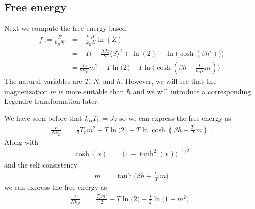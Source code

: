 \subsection{Free energy}
Next we compute the free energy based 
%
\begin{align*}
f:=\frac{F}{k_{B} N} &=-\frac{k_{B}T}{k_{B} N} \ln(Z)\\
&=-T \bigg( -\frac{\beta J z}{2} \langle S \rangle^{2} 
+\ln(2) 
+\ln\big( \cosh(\beta h')   \big) 
\bigg)\\
&=
\frac{J z}{2 k_{B}} m^{2}  - T
\ln\big(2\big)  - T\ln\big( \cosh(\beta h + \frac{J z}{k_{B}T} m)\big)\;.
\end{align*}
%
The natural variables are  $T$, $N$, and $h$.
However, we will see that the magnetization $m$ is more suitable than $h$ and we will
introduce a corresponding Legendre transformation later.

We have seen before that $k_{B} T_{C} = J z$ so we can 
express the free energy as
%
\begin{align*}
\frac{F}{N k_{B}} &= \frac{1}{2} T_{c} m^{2}
-  T\ln\big(2\big) - T\ln{ \cosh(\beta h + \frac{T_{c}}{T} m)  }\;.
\end{align*}
%
Along with
%
\begin{align*}
\cosh(x) &= \big(1-\tanh^{2}(x)\big)^{-1/2} 
\end{align*}
and the self consistency 
%
\begin{align}\label{eq:magnetization}
m &= \tanh\big( \beta h + \frac{T_{C}}{T} m \big)
\end{align}
%
we can express the free energy as
%
\begin{align}\label{eq:isingh:mfa:F}
\frac{F}{N k_{B}} &= \frac{T_{c} m^{2}}{2} 
-  T\ln\big(2\big)  + \frac{T}{2} \ln\big(1-m^{2}\big)\;.
\end{align}
%

